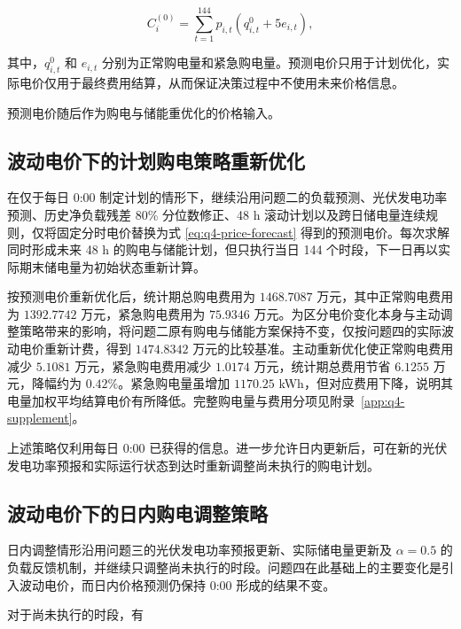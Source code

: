 \documentclass[12pt,a4paper]{ctexart}
\begin{document}
\begin{equation}
C_i^{(0)}
=
\sum_{t=1}^{144}
p_{i,t}
\left(
q_{i,t}^{0}+5e_{i,t}
\right),
\label{eq:q4-actual-settlement}
\end{equation}

\par\noindent 其中，$q_{i,t}^{0}$ 和 $e_{i,t}$ 分别为正常购电量和紧急购电量。预测电价只用于计划优化，实际电价仅用于最终费用结算，从而保证决策过程中不使用未来价格信息。

\par\noindent\hspace*{2em}预测电价随后作为购电与储能重优化的价格输入。

\subsection{波动电价下的计划购电策略重新优化}
在仅于每日 0:00 制定计划的情形下，继续沿用问题二的负载预测、光伏发电功率预测、历史净负载残差 80\% 分位数修正、48 h 滚动计划以及跨日储电量连续规则，仅将固定分时电价替换为式 \eqref{eq:q4-price-forecast} 得到的预测电价。每次求解同时形成未来 48 h 的购电与储能计划，但只执行当日 144 个时段，下一日再以实际期末储电量为初始状态重新计算。

按预测电价重新优化后，统计期总购电费用为 $1468.7087$ 万元，其中正常购电费用为 $1392.7742$ 万元，紧急购电费用为 $75.9346$ 万元。为区分电价变化本身与主动调整策略带来的影响，将问题二原有购电与储能方案保持不变，仅按问题四的实际波动电价重新计费，得到 $1474.8342$ 万元的比较基准。主动重新优化使正常购电费用减少 $5.1081$ 万元，紧急购电费用减少 $1.0174$ 万元，统计期总费用节省 $6.1255$ 万元，降幅约为 $0.42\%$。紧急购电量虽增加 $1170.25$ kWh，但对应费用下降，说明其电量加权平均结算电价有所降低。完整购电量与费用分项见附录~\ref{app:q4-supplement}。

\par\noindent\hspace*{2em}上述策略仅利用每日 0:00 已获得的信息。进一步允许日内更新后，可在新的光伏发电功率预报和实际运行状态到达时重新调整尚未执行的购电计划。

\subsection{波动电价下的日内购电调整策略}
日内调整情形沿用问题三的光伏发电功率预报更新、实际储电量更新及 $\alpha=0.5$ 的负载反馈机制，并继续只调整尚未执行的时段。问题四在此基础上的主要变化是引入波动电价，而日内价格预测仍保持 0:00 形成的结果不变。

对于尚未执行的时段，有
\end{document}
